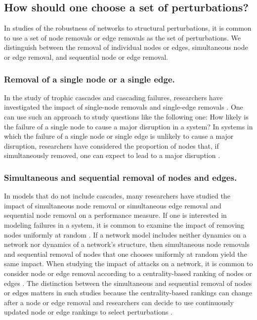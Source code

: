 \documentclass{comnet-mod}
\begin{document}
\subsection{How should one choose a set of perturbations?}

In studies of the robustness of networks to structural perturbations, it is common to use a set of node removals or edge removals as the set of perturbations. We distinguish between the removal of individual nodes or edges, simultaneous node or edge removal, and sequential node or edge removal.


\subsubsection{Removal of a single node or a single edge.}


In the study of trophic cascades and cascading failures, researchers have investigated the impact of single-node removals and single-edge removals \cite{Dunne2002, Motter2002, Crucitti2004, Dunne2004}. One can use such an approach to study questions like the following one: How likely is the failure of a single node to cause a major disruption in a system? In systems in which the failure of a single node or single edge is unlikely to cause a major disruption, researchers have considered the proportion of nodes that, if simultaneously removed, one can expect to lead to a major disruption \cite{Cohen2000, Shargel2003, Paul2004, Tanizawa2005, Wang2006, Sole2008, Rosas-Casals2007}.


\subsubsection{Simultaneous and sequential removal of nodes and edges.}

In models that do not include cascades, many researchers have studied the impact of simultaneous node removal or simultaneous edge removal \cite{Tanizawa2005, Greco2012, Yang2015, Colladon2017, Galias2017, Rosas-Casals2007} and sequential node removal \cite{Holme2002, Herrmann2011, Schneider2011, Zeng2012, Zhou2014, Agreste2016, Hong2017} on a performance measure. 
If one is interested in modeling failures in a system, it is common to examine the impact of removing nodes uniformly at random \cite{Albert2000, Cohen2000, Crucitti2004a}. If a network model includes neither dynamics on a network nor dynamics of a network's structure, then simultaneous node removals and sequential removal of nodes that one chooses uniformly at random yield the same impact. When studying the impact of attacks on a network, it is common to consider node or edge removal according to a centrality-based ranking of nodes or edges \cite{Albert2000, Iyer2013, Lordan2014, Ventresca2014}. The distinction between the simultaneous and sequential removal of nodes or edges matters in such studies because the centrality-based rankings can change after a node or edge removal and researchers can decide to use continuously updated node or edge rankings to select perturbations \cite{Holme2002, Agreste2016}.
\end{document}
